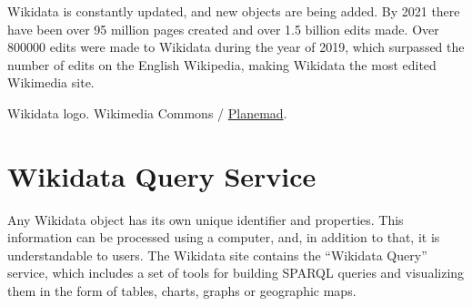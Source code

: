 Wikidata is constantly updated, and new objects are being added. By 2021 there have been over 95 million pages created and over 1.5 billion edits made. Over \num{800000} edits were made to Wikidata during the year of 2019, which surpassed the number of edits on the English Wikipedia, making Wikidata the most edited Wikimedia site.
\begin{marginfigure}[1cm]
{
	\setlength{\fboxsep}{0pt}%
	\setlength{\fboxrule}{1pt}%
}
\caption
{Wikidata logo. \newline
Wikimedia Commons / \href{https://commons.wikimedia.org/wiki/File:Wikidata-logo-en.svg}{Planemad}. 
}
\label{fig:wikidata_logo}
\end{marginfigure}

\section{Wikidata Query Service}
Any Wikidata object has its own unique identifier and properties. This information can be processed using a computer, and, in addition to that, it is understandable to users. 
\newpage
The Wikidata site contains the ``Wikidata Query'' service, which includes a set of tools for building SPARQL queries and visualizing them in the form of tables, charts, graphs or geographic maps.

